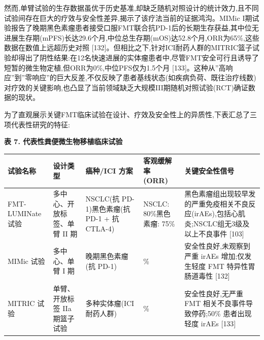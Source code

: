 \documentclass[11pt]{article}
\newcounter{none}
\begin{document}
然而,单臂试验的生存数据虽优于历史基准,却缺乏随机对照设计的统计效力,且不同试验间存在巨大的疗效与安全性差异,揭示了该疗法当前的证据鸿沟。MIMic I期试验报告了晚期黑色素瘤患者接受口服FMT联合抗PD-1后的长期生存获益,其中位无进展生存期(mPFS)长达29.6个月,中位总生存期(mOS)达52.8个月,ORR为65\%,这些数据在数值上远超历史对照 {[}132{]}。但相比之下,针对ICI耐药人群的MITRIC篮子试验却得出了阴性结果:在12名快速进展的实体瘤患者中,尽管FMT安全可行且诱导了短暂的微生物定植,但ORR为0\%,中位PFS仅为1.5个月 {[}133{]}。这种从''高响应''到''零响应''的巨大反差,不仅反映了患者基线状态(如疾病负荷、既往治疗线数)对疗效的关键影响,也凸显了当前领域缺乏大规模III期随机对照试验(RCT)确证数据的现状。

为了直观展示关键FMT临床试验在设计、疗效及安全性上的异质性,下表汇总了三项代表性研究的特征:

\textbf{表 7. 代表性粪便微生物移植临床试验}

{\def\LTcaptype{none} %
\begin{longtable}[]{@{}
  >{\raggedright\arraybackslash}p{}
  >{\raggedright\arraybackslash}p{}
  >{\raggedright\arraybackslash}p{}
  >{\raggedright\arraybackslash}p{}
  >{\raggedright\arraybackslash}p{}@{}}
\toprule\noalign{}
\begin{minipage}[b]{\linewidth}\raggedright
试验名称
\end{minipage} & \begin{minipage}[b]{\linewidth}\raggedright
设计类型
\end{minipage} & \begin{minipage}[b]{\linewidth}\raggedright
癌种/ICI 方案
\end{minipage} & \begin{minipage}[b]{\linewidth}\raggedright
客观缓解率 (ORR)
\end{minipage} & \begin{minipage}[b]{\linewidth}\raggedright
关键安全性信号
\end{minipage} \\
\midrule\noalign{}
\endhead
\bottomrule\noalign{}
\endlastfoot
FMT-LUMINate 试验 & 多中心、开放标签、单臂 II 期 & NSCLC(抗 PD-1)黑色素瘤(抗 PD-1 + 抗 CTLA-4) & NSCLC: 80\%黑色素瘤: 75\% & 黑色素瘤组出现较早发的严重免疫相关不良反应(irAEs),包括心肌炎;NSCLC组无3级及以上不良事件 {[}103{]} \\
MIMic 试验 & 多中心、单臂 I 期 & 晚期黑色素瘤(抗 PD-1) & 65\% & 安全性良好,未观察到严重 irAEs 增加;仅发生轻度 FMT 特异性胃肠道毒性 {[}132{]} \\
MITRIC 试验 & 单臂、开放标签 IIa 期篮子试验 & 多种实体瘤(ICI 耐药人群) & 0\% & 安全性良好,无严重 FMT 相关不良事件导致停药;50\% 患者出现轻度 irAEs {[}133{]} \\
\end{longtable}
}
\end{document}
